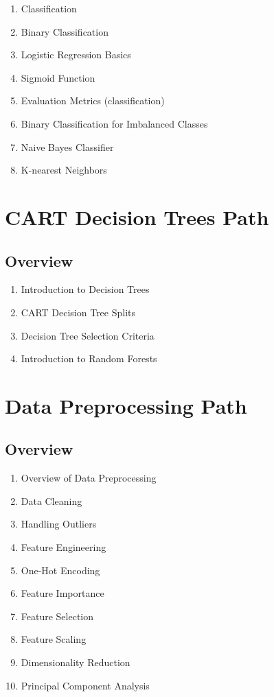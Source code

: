 \documentclass{article}
\begin{document}
\begin{enumerate}
    \item Classification
    \item Binary Classification
    \item Logistic Regression Basics
    \item Sigmoid Function
    \item Evaluation Metrics (classification)
    \item Binary Classification for Imbalanced Classes
    \item Naive Bayes Classifier
    \item K-nearest Neighbors
\end{enumerate}

\section{CART Decision Trees Path}
\subsection{Overview}%
\label{sub:Overview}

\begin{enumerate}
    \item Introduction to Decision Trees
    \item CART Decision Tree Splits
    \item Decision Tree Selection Criteria
    \item Introduction to Random Forests
\end{enumerate}

\section{Data Preprocessing Path}
\subsection{Overview}%
\label{sub:Overview}

\begin{enumerate}
    \item Overview of Data Preprocessing
    \item Data Cleaning
    \item Handling Outliers
    \item Feature Engineering
    \item One-Hot Encoding
    \item Feature Importance
    \item Feature Selection
    \item Feature Scaling
    \item Dimensionality Reduction
    \item Principal Component Analysis
\end{enumerate}
\end{document}
